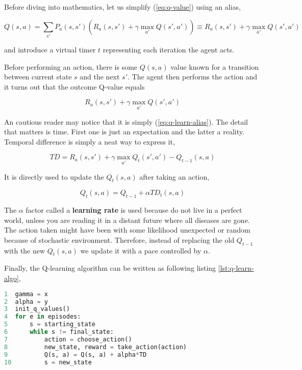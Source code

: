 Before diving into mathematics, let us simplify (\ref{eq:q-value}) using an alias,

\begin{equation}
    Q(s, a) = \sum_{s'} P_a(s, s') \left(R_a(s, s') + \gamma \max_{a'} Q(s', a') \right)
    \equiv
    R_a(s, s') + \gamma \max_{a'} Q(s', a')
\label{eq:q-learn-alias}
\end{equation}

and introduce a virtual timer $t$ representing each iteration the agent acts.

Before performing an action, there is some $Q(s, a)$ value known for a transition between current state $s$ and the next $s'$. The agent then performs the action and it turns out that the outcome Q-value equals 

\begin{equation}
    R_a(s, s') + \gamma \max_{a'} Q(s', a')
\end{equation}

An cautious reader may notice that it is simply (\ref{eq:q-learn-alias}). The detail that matters is time. First one is just an expectation and the latter a reality. Temporal difference is simply a neat way to express it,

\begin{equation}
    TD = R_a(s, s') + \gamma \max_{a'} Q_{t}(s', a') - Q_{t-1}(s, a)
\label{eq:temporal-difference}
\end{equation}

It is directly used to update the $Q_t(s, a)$ after taking an action,

\begin{equation}
    Q_t(s, a) = Q_{t-1} + \alpha TD_t(s, a)
\end{equation}

The $\alpha$ factor called a \textbf{learning rate} is used because do not live in a perfect world, unless you are reading it in a distant future where all diseases are gone. The action taken might have been with some likelihood unexpected or random because of stochastic environment. Therefore, instead of replacing the old $Q_{t-1}$ with the new $Q_t(s, a)$ we update it with a pace controlled by $\alpha$.

\newpage

Finally, the Q-learning algorithm can be written as following listing \ref{lst:q-learn-algo},

\begin{lstlisting}[language=Python, caption={Q-learning algorithm}, label={lst:q-learn-algo}]
1  gamma = x
2  alpha = y
3  init_q_values()
4  for e in episodes:
5      s = starting_state
6      while s != final_state:
7          action = choose_action()
8          new_state, reward = take_action(action)
9          Q(s, a) = Q(s, a) + alpha*TD
10         s = new_state
\end{lstlisting}

